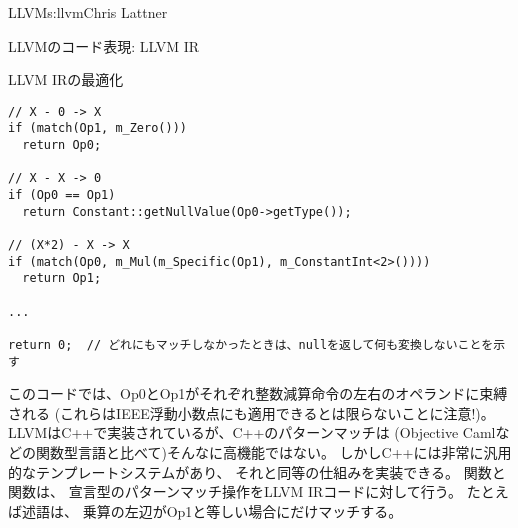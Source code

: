 \begin{aosachapter}{LLVM}{s:llvm}{Chris Lattner}
\begin{aosasect1}{LLVMのコード表現: LLVM IR}
\begin{aosasect2}{LLVM IRの最適化}




\begin{verbatim}
// X - 0 -> X
if (match(Op1, m_Zero()))
  return Op0;

// X - X -> 0
if (Op0 == Op1)
  return Constant::getNullValue(Op0->getType());

// (X*2) - X -> X
if (match(Op0, m_Mul(m_Specific(Op1), m_ConstantInt<2>())))
  return Op1;

...

return 0;  // どれにもマッチしなかったときは、nullを返して何も変換しないことを示す
\end{verbatim}

\noindent
このコードでは、Op0とOp1がそれぞれ整数減算命令の左右のオペランドに束縛される
(これらはIEEE浮動小数点にも適用できるとは限らないことに注意!)。
LLVMはC++で実装されているが、C++のパターンマッチは
(Objective Camlなどの関数型言語と比べて)そんなに高機能ではない。
しかしC++には非常に汎用的なテンプレートシステムがあり、
それと同等の仕組みを実装できる。
関数と関数は、
宣言型のパターンマッチ操作をLLVM IRコードに対して行う。
たとえば述語は、
乗算の左辺がOp1と等しい場合にだけマッチする。


\end{aosasect2}
\end{aosasect1}
\end{aosachapter}
